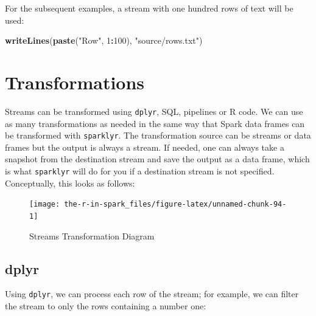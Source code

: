 \documentclass[]{book}
\newenvironment{Shaded}{\begin{snugshade}}{\end{snugshade}}
\newcommand{\DataTypeTok}[1]{\textcolor[rgb]{0.13,0.29,0.53}{#1}}
\newcommand{\DecValTok}[1]{\textcolor[rgb]{0.00,0.00,0.81}{#1}}
\newcommand{\KeywordTok}[1]{\textcolor[rgb]{0.13,0.29,0.53}{\textbf{#1}}}
\newcommand{\NormalTok}[1]{#1}
\newcommand{\OperatorTok}[1]{\textcolor[rgb]{0.81,0.36,0.00}{\textbf{#1}}}
\newcommand{\OtherTok}[1]{\textcolor[rgb]{0.56,0.35,0.01}{#1}}
\newcommand{\StringTok}[1]{\textcolor[rgb]{0.31,0.60,0.02}{#1}}
\theoremstyle{definition}
\theoremstyle{definition}
\theoremstyle{definition}
\theoremstyle{remark}
\begin{document}
For the subsequent examples, a stream with one hundred rows of text will
be used:

\begin{Shaded}
\begin{Highlighting}[]
\KeywordTok{writeLines}\NormalTok{(}\KeywordTok{paste}\NormalTok{(}\StringTok{"Row"}\NormalTok{, }\DecValTok{1}\OperatorTok{:}\DecValTok{100}\NormalTok{), }\StringTok{"source/rows.txt"}\NormalTok{)}
\end{Highlighting}
\end{Shaded}

\hypertarget{transformations}{%
\section{Transformations}\label{transformations}}

Streams can be transformed using \texttt{dplyr}, SQL, pipelines or R
code. We can use as many transformations as needed in the same way that
Spark data frames can be transformed with \texttt{sparklyr}. The
transformation source can be streams or data frames but the output is
always a stream. If needed, one can always take a snapshot from the
destination stream and save the output as a data frame, which is what
\texttt{sparklyr} will do for you if a destination stream is not
specified. Conceptually, this looks as follows:

\begin{figure}

{\centering \texttt{[image: the-r-in-spark\_files/figure-latex/unnamed-chunk-94-1]} 

}

\caption{Streams Transformation Diagram}\label{fig:unnamed-chunk-94}
\end{figure}

\hypertarget{streams-dplyr}{%
\subsection{dplyr}\label{streams-dplyr}}

Using \texttt{dplyr}, we can process each row of the stream; for
example, we can filter the stream to only the rows containing a number
one:

\begin{Shaded}
\end{Shaded}
\end{document}
